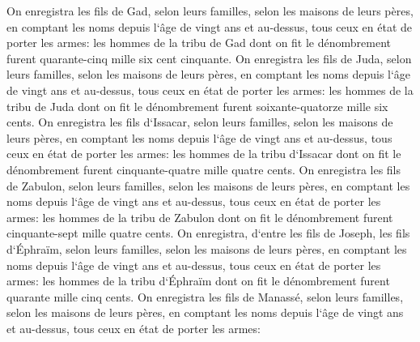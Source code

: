\verse On enregistra les fils de Gad, selon leurs familles, selon les maisons de leurs pères, en comptant les noms depuis l`âge de vingt ans et au-dessus, tous ceux en état de porter les armes: 
\verse les hommes de la tribu de Gad dont on fit le dénombrement furent quarante-cinq mille six cent cinquante. 
\verse On enregistra les fils de Juda, selon leurs familles, selon les maisons de leurs pères, en comptant les noms depuis l`âge de vingt ans et au-dessus, tous ceux en état de porter les armes: 
\verse les hommes de la tribu de Juda dont on fit le dénombrement furent soixante-quatorze mille six cents. 
\verse On enregistra les fils d`Issacar, selon leurs familles, selon les maisons de leurs pères, en comptant les noms depuis l`âge de vingt ans et au-dessus, tous ceux en état de porter les armes: 
\verse les hommes de la tribu d`Issacar dont on fit le dénombrement furent cinquante-quatre mille quatre cents. 
\verse On enregistra les fils de Zabulon, selon leurs familles, selon les maisons de leurs pères, en comptant les noms depuis l`âge de vingt ans et au-dessus, tous ceux en état de porter les armes: 
\verse les hommes de la tribu de Zabulon dont on fit le dénombrement furent cinquante-sept mille quatre cents. 
\verse On enregistra, d`entre les fils de Joseph, les fils d`Éphraïm, selon leurs familles, selon les maisons de leurs pères, en comptant les noms depuis l`âge de vingt ans et au-dessus, tous ceux en état de porter les armes: 
\verse les hommes de la tribu d`Éphraïm dont on fit le dénombrement furent quarante mille cinq cents. 
\verse On enregistra les fils de Manassé, selon leurs familles, selon les maisons de leurs pères, en comptant les noms depuis l`âge de vingt ans et au-dessus, tous ceux en état de porter les armes: 
